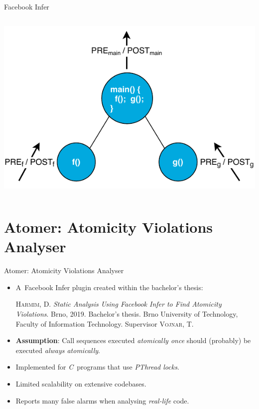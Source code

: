 \documentclass[%
    10pt, xcolor=pdflatex, hyperref={unicode}, aspectratio=169%
]{beamer}
\begin{document}
\begin{frame}{Facebook Infer}
\begin{columns}
        \begin{column}{.45 \linewidth}
            \centering
            \includegraphics[width=1 \linewidth]{img/infer.pdf}
        \end{column}
    \end{columns}
\end{frame}


\section{Atomer: Atomicity Violations Analyser}
\begin{frame}{Atomer: Atomicity Violations Analyser}
    \begin{itemize}\setlength\itemsep{2em}
        \item
            A~\alert{Facebook Infer plugin} created within
            the bachelor's thesis:
            \medskip
            \begin{thebibliography}{1}
                \textsc{Harmim, D.} \textit{Static Analysis Using Facebook
                Infer to Find Atomicity Violations}. Brno, 2019. Bachelor's
                thesis. Brno University of Technology, Faculty of Information
                Technology. Supervisor \textsc{Vojnar, T.}
            \end{thebibliography}

        \item
            \textbf{Assumption}: \alert{Call sequences} executed
            \emph{atomically once} should (probably) be executed
            \emph{always atomically}.

        \item
            Implemented for \emph{C}~programs that use \emph{PThread locks}.
            
        \item
            Limited \alert{scalability} on extensive codebases.
            
        \item
            Reports many \alert{false alarms} when analysing \emph{real-life}
            code.
    \end{itemize}
\end{frame}
\end{document}
